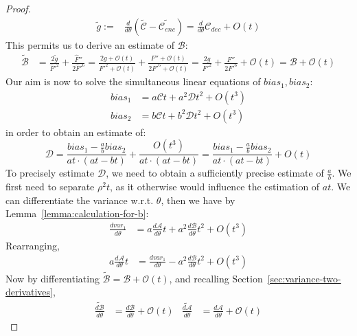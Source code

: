 \begin{proof}
\begin{align*}
    \tilde{g} := &\frac{d}{d\theta} \left(\tilde{\mathcal{C}} - \tilde{\mathcal{C}_{enc}}\right) = \frac{d}{d\theta} \mathcal{C}_{dec} + O(t)
\end{align*}
    This permits us to derive an estimate of $\mathcal{B}$:
    \begin{align*}
    \tilde{\mathcal{B}} &= \frac{2\tilde{g}}{\widehat{F}'^2} + \frac{\widehat{F}''}{2\widehat{F}'^6} %
     = \frac{2g + \mathcal{O}(t)}{F'^2 + \mathcal{O}(t)} + \frac{F'' + \mathcal{O}(t)}{2F'^6 + \mathcal{O}(t)} %
     = \frac{2g}{F'^2} + \frac{F''}{2F'^6} + \mathcal{O}(t)  %
     = \mathcal{B} + \mathcal{O}(t) %
\end{align*}
Our aim is now to solve the simultaneous linear equations of $bias_1, bias_2$:
    \begin{align*}
        bias_1 &= a\mathcal{C}t + a^2\mathcal{D}t^2 + O(t^3)\\
        bias_2 &= b\mathcal{C}t + b^2\mathcal{D}t^2 + O(t^3)
    \end{align*}
in order to obtain an estimate of:
\begin{equation*}
    \mathcal{D} = \frac{bias_1 - \frac{a}{b}bias_2}{at \cdot (at - bt)} + \frac{O(t^3)}{at \cdot (at - bt)} = \frac{bias_1 - \frac{a}{b}bias_2}{at \cdot (at - bt)} + O(t)
\end{equation*}
To precisely estimate $\mathcal{D}$, we need to obtain a sufficiently precise estimate of  $\frac{a}{b}$. We first need to separate $\rho^2t$, as it otherwise would influence the estimation of $at$. 
We can differentiate the variance w.r.t. $\theta$, then we have by Lemma~\ref{lemma:calculation-for-b}:
\begin{align*}
    \frac{d var_1}{d \theta} &= a\frac{d \mathcal{A}}{d \theta}t + a^2 \frac{d \mathcal{B}}{d \theta} t^2 + O(t^3)
    \end{align*}
Rearranging,
    \begin{align*}
    a\frac{d \mathcal{A}}{d \theta}t &= \frac{d var_1}{d \theta} - a^2\frac{d \mathcal{B}}{d \theta} t^2 + O(t^3)
    \end{align*}
    Now by differentiating $\tilde{\mathcal{B}} = \mathcal{B} + \mathcal{O}(t)$, and recalling Section~\ref{sec:variance-two-derivatives},
    \begin{align*}
    \tilde{\frac{d \mathcal{B}}{d \theta}} &= \frac{d \mathcal{B}}{d \theta} + \mathcal{O}(t) &
    \tilde{\frac{d \mathcal{A}}{d \theta}} &= \frac{d \mathcal{A}}{d \theta} + \mathcal{O}(t)

\end{align*}
\end{proof}
